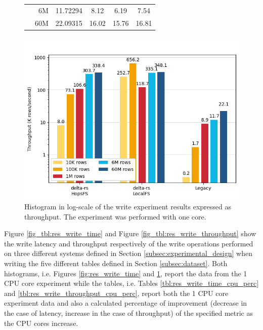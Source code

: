 \begin{figure}
\begin{minipage}[b]{\textwidth}
\begin{tabular}{c r S[table-format=4.5] S[table-format=2.2] S[table-format=2.2] S[table-format=2.2]}
            & 6M &   11.72294 & 8.12 & 6.19 & 7.54\\
            & 60M &  22.09315 & 16.02 & 15.76 & 16.81\\
            \bottomrule
        \end{tabular}
    \end{minipage}
    \begin{minipage}[b]{\textwidth}
        \includegraphics[width=\textwidth]{figures/5-results/write/write_throughput_1_core.png}
        \caption[Histogram of the write experiment - Throughput - 1 CPU core]{Histogram in log-scale of the write experiment results expressed as throughput. The experiment was performed with one  core.}
        \label{fig:res_write_throughput}
    \end{minipage}
\end{figure}

Figure \ref{fig_tbl:res_write_time} and Figure \ref{fig_tbl:res_write_throughput} show the write latency and throughput respectively of the write operations performed on three different systems defined in Section \ref{subsec:experimental_design} when writing the five different tables defined in Section \ref{subsec:dataset}. Both histograms, i.e. Figures \ref{fig:res_write_time} and \ref{fig:res_write_throughput}, report the data from the 1 \gls{CPU} core experiment while the tables, i.e. Tables \ref{tbl:res_write_time_cpu_perc} and \ref{tbl:res_write_throughput_cpu_perc}, report both the 1 \gls{CPU} core experiment data and also a calculated percentage of improvement (decrease in the case of latency, increase in the case of throughput) of the specified metric as the \gls{CPU} cores increase.

